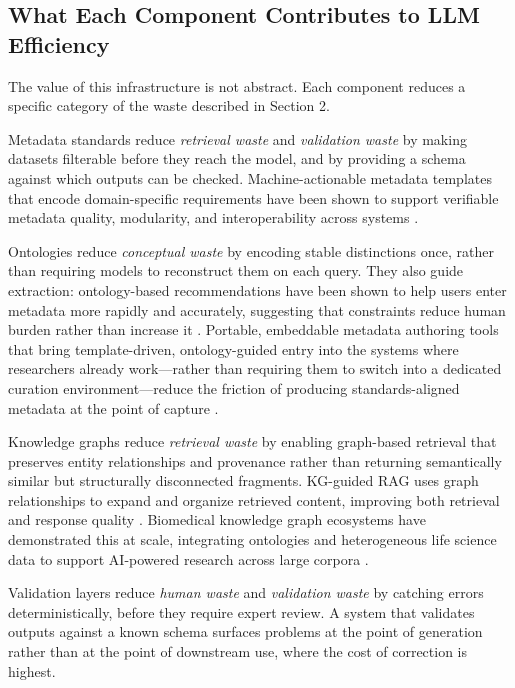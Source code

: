 \documentclass[man,12pt,donotrepeattitle]{apa7}
\begin{document}
\subsection{What Each Component Contributes to LLM Efficiency}

The value of this infrastructure is not abstract. Each component reduces
a specific category of the waste described in Section 2.

Metadata standards reduce \textit{retrieval waste} and \textit{validation
waste} by making datasets filterable before they reach the model, and by
providing a schema against which outputs can be checked. Machine-actionable
metadata templates that encode domain-specific requirements have been shown
to support verifiable metadata quality, modularity, and interoperability
across systems \parencite{batista2022,musen2022}.

Ontologies reduce \textit{conceptual waste} by encoding stable distinctions
once, rather than requiring models to reconstruct them on each query. They
also guide extraction: ontology-based recommendations have been shown to
help users enter metadata more rapidly and accurately, suggesting that
constraints reduce human burden rather than increase it
\parencite{martinezromero2017}. Portable, embeddable metadata authoring
tools that bring template-driven, ontology-guided entry into the systems
where researchers already work---rather than requiring them to switch into
a dedicated curation environment---reduce the friction of producing
standards-aligned metadata at the point of capture \parencite{oconnor2026}.

Knowledge graphs reduce \textit{retrieval waste} by enabling graph-based
retrieval that preserves entity relationships and provenance rather than
returning semantically similar but structurally disconnected fragments.
KG-guided RAG uses graph relationships to expand and organize retrieved
content, improving both retrieval and response quality \parencite{zhu2025}.
Biomedical knowledge graph ecosystems have demonstrated this at scale,
integrating ontologies and heterogeneous life science data to support
AI-powered research across large corpora \parencite{callahan2024}.

Validation layers reduce \textit{human waste} and \textit{validation waste}
by catching errors deterministically, before they require expert review. A
system that validates outputs against a known schema surfaces problems at
the point of generation rather than at the point of downstream use, where
the cost of correction is highest.
\end{document}
